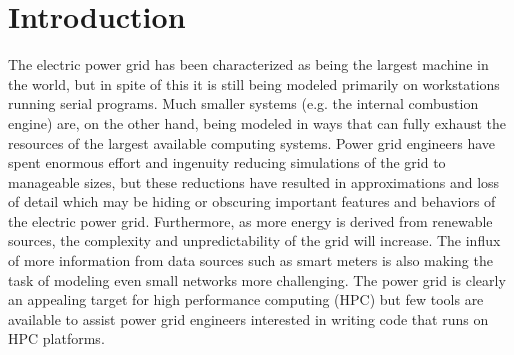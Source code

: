 \documentclass[preprint]{acm_proc_article-sp}
\begin{document}
\maketitle
\begin{abstract}
This paper describes the GridPACK\texttrademark framework, which is designed to help
power grid engineers develop modeling software capable of running on high
performance computers. The framework makes extensive use of software templates to
provide high level functionality while at the same time allowing developers the
freedom to express whatever models and algorithms they are using.
GridPACK\texttrademark contains modules for setting up distributed
power grid networks, assigning buses and branches with arbitrary behaviors to
the network, creating distributed matrices and vectors and using parallel linear
and non-linear solvers to solve algebraic equations. It also provides mappers
to create matrices and vectors based on properties of the network and
functionality to support IO and to manage errors. The goal of
GridPACK\texttrademark is to substantially reduce the complexity of
writing software for parallel computers while still providing efficient and 
scalable software solutions. The use of GridPACK\texttrademark is illustrated
for a simple powerflow example and performance results for powerflow and dynamic
simulation are discussed.
\end{abstract}


\renewcommand{\thefootnote}{\fnsymbol{footnote}}

\section{Introduction}
The electric power grid has been characterized as being the largest machine in
the world, but in spite of this it is still being modeled primarily on workstations running
serial programs. Much smaller systems (e.g. the internal combustion
engine\cite{EXACT}) are, on the other hand,
being modeled in ways that can fully exhaust the resources of
the largest available computing systems. Power grid engineers have spent
enormous effort and ingenuity reducing simulations of the grid to manageable sizes,
but these reductions have resulted in approximations and loss of detail which may
be hiding or obscuring important features and behaviors of the electric power
grid.
Furthermore, as more energy is derived from renewable sources, the
complexity and unpredictability of the grid will increase. The influx of more
information from data sources such as smart meters is also making the task of modeling
even small networks more challenging. The power grid is clearly an
appealing target for high performance computing (HPC) but few
tools are available to assist power grid engineers interested in writing code
that runs on HPC platforms.
\end{document}

